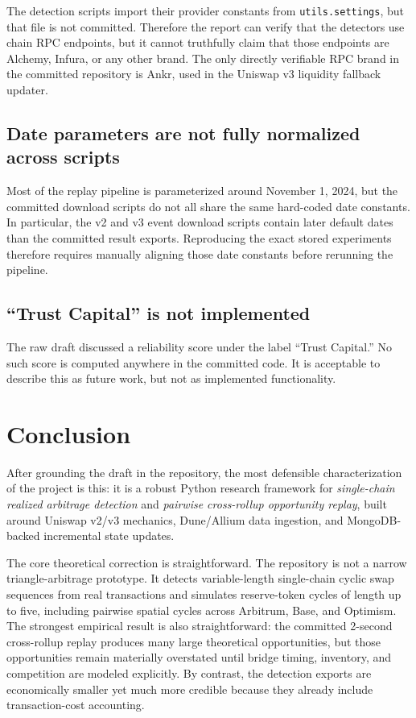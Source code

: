 \documentclass[11pt]{article}
\begin{document}
The detection scripts import their provider constants from \texttt{utils.settings}, but that file is not committed. Therefore the report can verify that the detectors use chain RPC endpoints, but it cannot truthfully claim that those endpoints are Alchemy, Infura, or any other brand. The only directly verifiable RPC brand in the committed repository is Ankr, used in the Uniswap v3 liquidity fallback updater.

\subsection{Date parameters are not fully normalized across scripts}

Most of the replay pipeline is parameterized around November 1, 2024, but the committed download scripts do not all share the same hard-coded date constants. In particular, the v2 and v3 event download scripts contain later default dates than the committed result exports. Reproducing the exact stored experiments therefore requires manually aligning those date constants before rerunning the pipeline.

\subsection{``Trust Capital'' is not implemented}

The raw draft discussed a reliability score under the label ``Trust Capital.'' No such score is computed anywhere in the committed code. It is acceptable to describe this as future work, but not as implemented functionality.

\section{Conclusion}

After grounding the draft in the repository, the most defensible characterization of the project is this: it is a robust Python research framework for \emph{single-chain realized arbitrage detection} and \emph{pairwise cross-rollup opportunity replay}, built around Uniswap v2/v3 mechanics, Dune/Allium data ingestion, and MongoDB-backed incremental state updates.

The core theoretical correction is straightforward. The repository is not a narrow triangle-arbitrage prototype. It detects variable-length single-chain cyclic swap sequences from real transactions and simulates reserve-token cycles of length up to five, including pairwise spatial cycles across Arbitrum, Base, and Optimism. The strongest empirical result is also straightforward: the committed 2-second cross-rollup replay produces many large theoretical opportunities, but those opportunities remain materially overstated until bridge timing, inventory, and competition are modeled explicitly. By contrast, the detection exports are economically smaller yet much more credible because they already include transaction-cost accounting.
\end{document}
